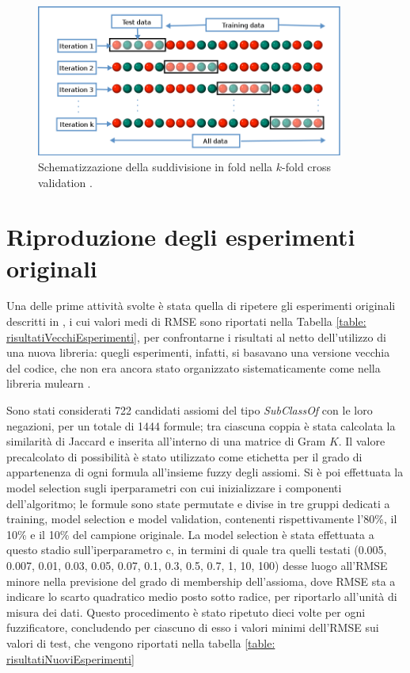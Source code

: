 \documentclass[12pt,a4paper]{report}
\begin{document}
\begin{figure}[h]	
\centering
\includegraphics[width=0.9\textwidth]{images/782px-K-fold_cross_validation_EN.svg.png}
\caption{Schematizzazione della suddivisione in fold nella $k$-fold cross validation \cite{crossValidationImage}.}
\label{scikitSchema}
\end{figure}

\section{Riproduzione degli esperimenti originali}
Una delle prime attività svolte è stata quella di ripetere gli esperimenti originali descritti in \cite{sacpaper}, i cui valori medi di RMSE sono riportati nella Tabella \ref{table: risultatiVecchiEsperimenti}, per confrontarne i risultati al netto dell'utilizzo di una nuova libreria: quegli esperimenti, infatti, si basavano una versione vecchia del codice, che non era ancora stato organizzato sistematicamente come nella libreria mulearn \cite{mulearn}.

Sono stati considerati 722 candidati assiomi del tipo \emph{SubClassOf} con le loro negazioni, per un totale di 1444 formule;  tra ciascuna coppia è stata calcolata la similarità di Jaccard e inserita all'interno di una matrice di Gram $K$.
Il valore precalcolato di possibilità è stato utilizzato come etichetta per il grado di appartenenza di ogni formula all'insieme fuzzy degli assiomi.
Si è poi effettuata la model selection sugli iperparametri con cui inizializzare i componenti dell'algoritmo; le formule sono state permutate e divise in tre gruppi dedicati a training, model selection e model validation, contenenti rispettivamente l'80\%, il 10\% e il 10\% del campione originale.
La model selection è stata effettuata a questo stadio sull'iperparametro c, in termini di quale tra quelli testati (0.005, 0.007, 0.01, 0.03, 0.05, 0.07, 0.1, 0.3, 0.5, 0.7, 1, 10, 100) desse luogo all'RMSE minore nella previsione del grado di membership dell'assioma, dove RMSE sta a indicare lo scarto quadratico medio posto sotto radice, per riportarlo all'unità di misura dei dati.
Questo procedimento è stato ripetuto dieci volte per ogni fuzzificatore, concludendo per ciascuno di esso i valori minimi dell'RMSE sui valori di test, che vengono riportati nella tabella \ref{table: risultatiNuoviEsperimenti}
\end{document}
